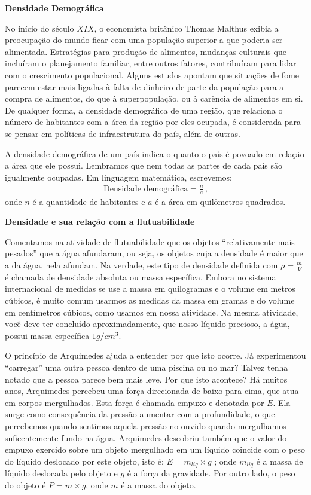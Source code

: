 \textbf{Densidade Demográfica}

No início do século \(XIX\), o economista britânico Thomas Malthus exibia a preocupação do mundo ficar com uma população superior a que poderia ser alimentada. Estratégias para produção de alimentos, mudanças culturais que incluíram o planejamento familiar, entre outros fatores, contribuíram para lidar com o crescimento populacional. Alguns estudos apontam que situações de fome parecem estar mais ligadas à falta de dinheiro de parte da população para a compra de alimentos, do que à superpopulação, ou à carência de alimentos em si. De qualquer forma, a densidade demográfica de uma região, que relaciona o número de habitantes com a área da região por eles ocupada, é considerada para se pensar em políticas de infraestrutura do país, além de outras.

A densidade demográfica de um país indica o quanto o país é povoado em relação a área que ele possui. Lembramos que nem todas as partes de cada país são igualmente ocupadas. Em linguagem matemática, escrevemos:
\begin{equation*}
\begin{split}\text{Densidade demográfica} = \frac{n}{a} \, \text{,}\end{split}
\end{equation*}
onde \(n\) é a quantidade de habitantes e \(a\) é a área em quilômetros quadrados.

\textbf{Densidade e sua relação com a flutuabilidade}

Comentamos na atividade de flutuabilidade que os objetos “relativamente mais pesados” que a água afundaram, ou seja, os objetos cuja a densidade é maior que a da água, nela afundam. Na verdade, este tipo de densidade definida com \(\rho = \frac{m}{V}\) é chamada de densidade absoluta ou massa específica. Embora no sistema internacional de medidas se use a massa em quilogramas e o volume em metros cúbicos, é  muito comum usarmos as medidas da massa em gramas e do volume em centímetros cúbicos, como usamos em nossa atividade. Na mesma atividade, você deve ter concluído aproximadamente, que nosso líquido precioso, a água, possui massa específica \(1 g/cm^3\).

O princípio de Arquimedes ajuda a entender por que isto ocorre. Já experimentou “carregar” uma outra pessoa dentro de uma piscina ou no mar? Talvez tenha notado que a pessoa parece bem mais leve. Por que isto acontece? Há muitos anos, Arquimedes percebeu uma força direcionada de baixo para cima, que atua em corpos mergulhados. Esta força é chamada empuxo e denotada por \(E\). Ela surge como consequência da pressão aumentar com a profundidade, o que percebemos quando sentimos aquela pressão no ouvido quando mergulhamos suficentemente fundo na água. Arquimedes descobriu também que o valor do empuxo exercido sobre um objeto mergulhado em um líquido coincide com o peso do líquido deslocado por este objeto, isto é: \(E = m_{liq} \times g\) ; onde \(m_{liq}\) é a massa de líquido deslocada pelo objeto e \(g\) é a força da gravidade. Por outro lado, o peso do objeto é \(P = m \times g\), onde \(m\) é a massa do objeto.

